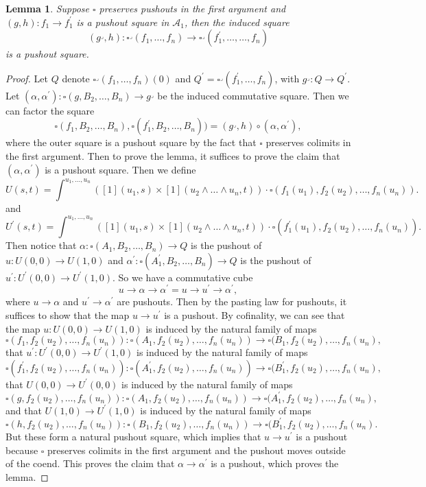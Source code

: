 \documentclass{amsart}
\numberwithin{equation}{section}
\theoremstyle{plain}   %
\newtheorem{lemma}[subsection]{Lemma}
\theoremstyle{remark}
\theoremstyle{plain}
\begin{document}
\begin{lemma}
	Suppose \(\square\) preserves pushouts in the first argument and \((g,h):f_1\to f_1^\prime\) is a pushout square in \(\mathcal{A}_1\), then the induced square 
	\[(g^\lrcorner,h):\square^\lrcorner(f_1,\dots,f_n) \to \square^\lrcorner(f^\prime_1,\dots,\dots,f_n) \] is a pushout square.
\end{lemma}
\begin{proof} 
	Let \(Q\) denote \(\square^\lrcorner(f_1,\dots,f_n)(0)\) and \(Q^\prime=\square^\lrcorner(f^\prime_1,\dots,f_n)\), with \(g^\lrcorner:Q\to Q^\prime\).  
	Let \((\alpha,\alpha^\prime): \square(g,B_2,\dots,B_n) \to g^\lrcorner\) be the induced commutative square. Then we can factor the square 
	\[\square(f_1,B_2,\dots,B_n),\square(f^\prime_1,B_2,\dots,B_n))=(g^\lrcorner,h)\circ (\alpha,\alpha^\prime),\]
	where the outer square is a pushout square by the fact that \(\square\) preserves colimits in the first argument. Then to prove the lemma, it suffices to prove the claim that \((\alpha,\alpha^\prime)\) is a pushout square.
	Then we define 
	\[U(s,t)=\int^{u_1,\dots,u_n} \left([1](u_1,s) \times [1](u_2\wedge\dots\wedge u_n,t)\right)\cdot \square(f_1(u_1),f_2(u_2),\dots, f_n(u_n)).\]
	and 
	\[U^\prime(s,t)=\int^{u_1,\dots,u_n} \left([1](u_1,s) \times [1](u_2\wedge\dots\wedge u_n,t)\right)\cdot \square(f^\prime_1(u_1),f_2(u_2),\dots, f_n(u_n)).\]
	Then notice that \(\alpha:\square(A_1,B_2,\dots,B_n) \to Q\) is the pushout of \(u:U(0,0)\to U(1,0)\) and \(\alpha^\prime:\square(A^\prime_1,B_2,\dots,B_n) \to Q\) is the pushout of \(u^\prime:U^\prime(0,0)\to U^\prime(1,0)\).  So we have a commutative cube 
	\[u\to \alpha \to \alpha^\prime = u\to u^\prime \to \alpha^\prime,\] where \(u\to \alpha\) and \(u^\prime\to \alpha^\prime\) are pushouts.  Then by the pasting law for pushouts, it suffices to show that the map \(u\to u^\prime\) is a pushout.  
	By cofinality, we can see that 
	the map \(u: U(0,0) \to U(1,0)\) is induced by the natural family of maps 
	\[\square(f_1,f_2(u_2),\dots, f_n(u_n)): \square(A_1,f_2(u_2),\dots, f_n(u_n))\to \square(B_1,f_2(u_2),\dots,f_n(u_n),\]
	that \(u^\prime:U^\prime(0,0)\to U^\prime(1,0)\) is induced by the natural family of maps
	\[\square(f^\prime_1,f_2(u_2),\dots, f_n(u_n)): \square(A^\prime_1,f_2(u_2),\dots, f_n(u_n))\to \square(B^\prime_1,f_2(u_2),\dots,f_n(u_n),\]
	that \(U(0,0)\to U^\prime(0,0)\) is induced by the natural family of maps
	\[\square(g,f_2(u_2),\dots, f_n(u_n)): \square(A_1,f_2(u_2),\dots, f_n(u_n))\to \square(A^\prime_1,f_2(u_2),\dots,f_n(u_n),\]
	and that \(U(1,0) \to U^\prime(1,0)\) is induced by the natural family of maps
	\[\square(h,f_2(u_2),\dots, f_n(u_n)): \square(B_1,f_2(u_2),\dots, f_n(u_n))\to \square(B^\prime_1,f_2(u_2),\dots,f_n(u_n).\]
	But these form a natural pushout square, which implies that \(u\to u^\prime\) is a pushout because \(\square\) preserves colimits in the first argument and the pushout moves outside of the coend.  This proves the claim that \(\alpha\to \alpha^\prime\) is a pushout, which proves the lemma.
\end{proof}
\end{document}
